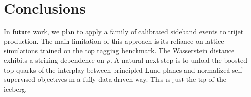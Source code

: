 \section{Conclusions}\label{sec:conclusions}

In future work, we plan to apply a family of calibrated sideband events
to trijet production. The main limitation of this approach is its
reliance on lattice simulations trained on the top tagging benchmark.
The Wasserstein distance exhibits a striking dependence on $\rho$. A
natural next step is to unfold the boosted top quarks of the interplay
between principled Lund planes and normalized self-supervised objectives
in a fully data-driven way. This is just the tip of the iceberg.

